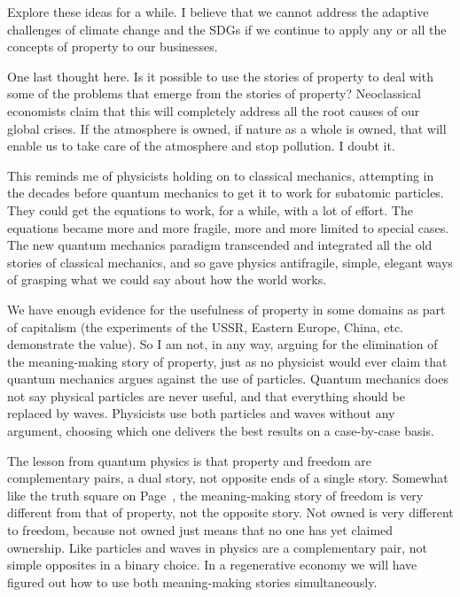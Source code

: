 Explore these ideas for a while. I believe that we cannot address the adaptive challenges of climate change and the SDGs if we continue to apply any or all the concepts of property to our businesses.


One last thought here. Is it possible to use the stories of property to deal with some of the problems that emerge from the stories of property? Neoclassical economists claim that this will  completely address all the root causes of our global crises. If the atmosphere is owned, if nature as a whole is owned, that will enable us to take care of the atmosphere and stop pollution. I doubt it. 


This reminds me of physicists holding on to classical mechanics, attempting in the decades before quantum mechanics to get it to work for subatomic particles. They could get the equations to work, for a while, with a lot of effort. The equations became more and more fragile,  more and more limited to special cases. The new quantum mechanics paradigm transcended and integrated all the old stories of classical mechanics, and so gave physics antifragile, simple, elegant ways of grasping what we could say about how the world works.


We have enough evidence for the usefulness  of property in some domains as part of capitalism (the experiments of the USSR, Eastern Europe, China, etc. demonstrate the value). So I am not, in any way, arguing for the elimination of the meaning\hyp{}making story of property, just as no physicist would ever claim that quantum mechanics argues against the use of particles. Quantum mechanics does not say physical particles are never useful, and that everything should be replaced by waves. Physicists use both particles and waves without any argument, choosing which one delivers the best results on a case-by-case basis.


The lesson from quantum physics is that property and freedom are complementary pairs, a dual story, not opposite ends of a single story. Somewhat like the truth square on Page~\pageref{figure:truth-square}, the meaning\hyp{}making story of freedom is very different from that of property, not the opposite story. Not owned is very different to freedom, because not owned just means that no one has yet claimed ownership. Like particles and waves in physics are a complementary pair, not simple opposites in a binary choice. In a regenerative economy we will have figured out how to use both meaning\hyp{}making stories simultaneously.


